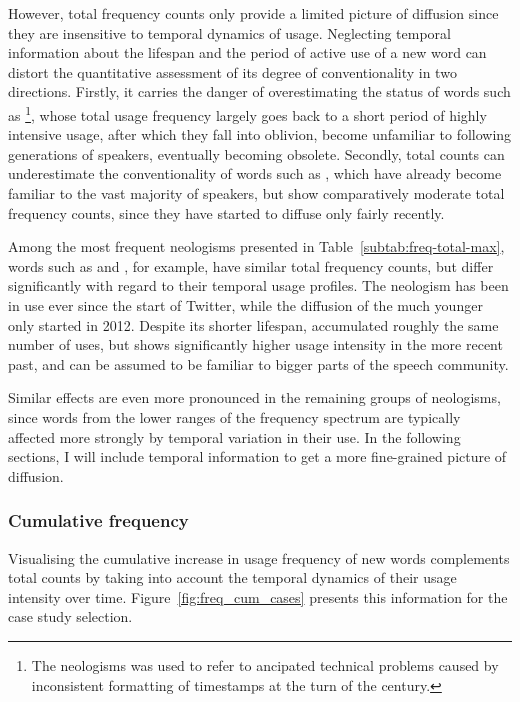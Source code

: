 \documentclass[
  a4paper,
  abstract=on,
  captions=tableabove
  ]{scrartcl}
\begin{document}
      However, total frequency counts only provide a limited picture of diffusion since they are insensitive to temporal dynamics of usage. Neglecting temporal information about the lifespan and the period of active use of a new word can distort the quantitative assessment of its degree of conventionality in two directions. Firstly, it carries the danger of overestimating the status of words such as \footnote{The neologisms  was used to refer to ancipated technical problems caused by inconsistent formatting of timestamps at the turn of the century.}, whose total usage frequency largely goes back to a short period of highly intensive usage, after which they fall into oblivion, become unfamiliar to following generations of speakers, eventually becoming obsolete. Secondly, total counts can underestimate the conventionality of words such as , which have already become familiar to the vast majority of speakers, but show comparatively moderate total frequency counts, since they have started to diffuse only fairly recently.

      Among the most frequent neologisms presented in Table~\ref{subtab:freq-total-max}, words such as  and , for example, have similar total frequency counts, but differ significantly with regard to their temporal usage profiles. The neologism  has been in use ever since the start of Twitter, while the diffusion of the much younger  only started in 2012. Despite its shorter lifespan,  accumulated roughly the same number of uses, but shows significantly higher usage intensity in the more recent past, and can be assumed to be familiar to bigger parts of the speech community.

      Similar effects are even more pronounced in the remaining groups of neologisms, since words from the lower ranges of the frequency spectrum are typically affected more strongly by temporal variation in their use. In the following sections, I will include temporal information to get a more fine-grained picture of diffusion.


    \subsubsection{Cumulative frequency}

      Visualising the cumulative increase in usage frequency of new words complements total counts by taking into account the temporal dynamics of their usage intensity over time. Figure~\ref{fig:freq_cum_cases} presents this information for the case study selection.
\end{document}
